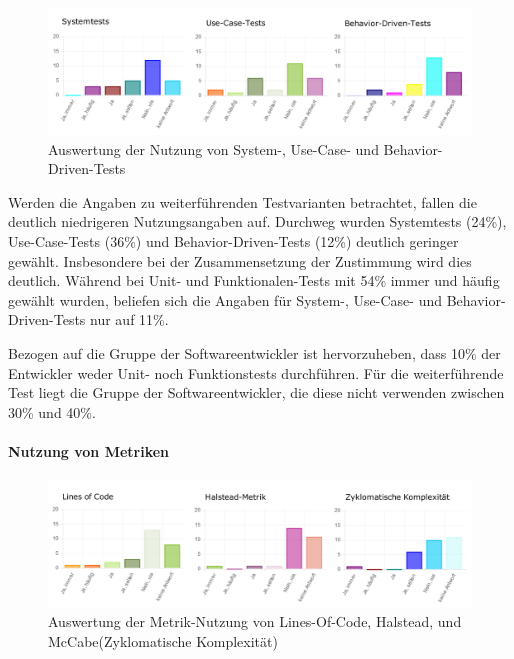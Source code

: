 \begin{figure}[htbp]
  \includegraphics[width=\textwidth, height=\textheight, keepaspectratio]
    {resources/survey-test-usage-special.pdf}
  \caption{Auswertung der Nutzung von System-, Use-Case- und Behavior-Driven-Tests}
\end{figure}

Werden die Angaben zu weiterführenden Testvarianten betrachtet, fallen die deutlich niedrigeren Nutzungsangaben auf. Durchweg wurden Systemtests (24\%), Use-Case-Tests (36\%) und Behavior-Driven-Tests (12\%) deutlich geringer gewählt. Insbesondere bei der Zusammensetzung der Zustimmung wird dies deutlich. Während bei Unit- und Funktionalen-Tests mit 54\% \glqq immer\grqq{} und \glqq häufig\grqq{} gewählt wurden, beliefen sich die Angaben für System-, Use-Case- und Behavior-Driven-Tests nur auf 11\%.

Bezogen auf die Gruppe der Softwareentwickler ist hervorzuheben, dass 10\% der Entwickler weder Unit- noch Funktionstests durchführen. Für die weiterführende Test liegt die Gruppe der Softwareentwickler, die diese nicht verwenden zwischen 30\% und 40\%.

\paragraph{Nutzung von Metriken}

\begin{figure}[htbp]
  \includegraphics[width=\textwidth, height=\textheight, keepaspectratio]
    {resources/survey-test-usage-metric.pdf}
  \caption{Auswertung der Metrik-Nutzung von Lines-Of-Code, Halstead, und McCabe(Zyklomatische Komplexität)}
\end{figure}


